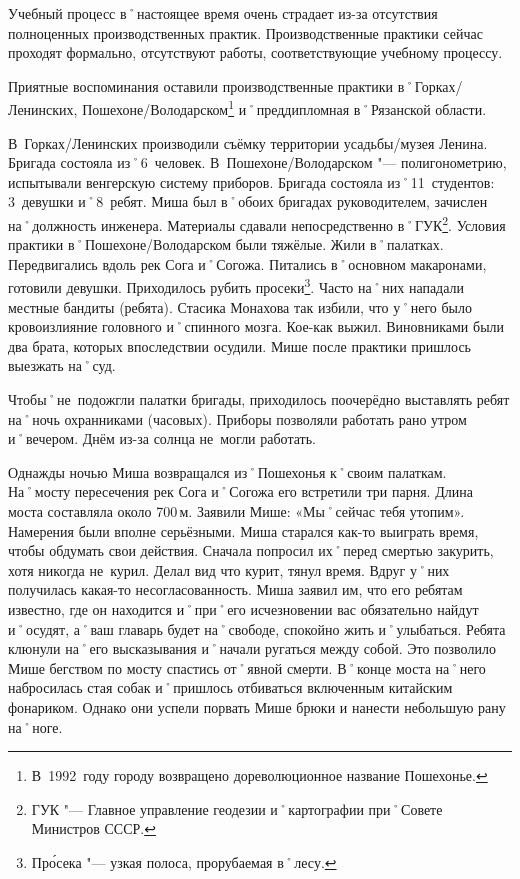 Учебный процесс в˚настоящее время очень страдает из-за отсутствия полноценных производственных практик. Производственные практики сейчас проходят формально, отсутствуют работы, соответствующие учебному процессу. 

Приятные воспоминания оставили производственные практики в˚Горках\-/Ленинских, Пошехоне\-/Володарском\footnote{В~1992~году городу возвращено дореволюционное название Пошехонье.} и˚преддипломная в˚Рязанской области.

В~Горках\-/Ленинских производили съёмку территории усадьбы\-/музея Ленина. Бригада состояла из˚6~человек. В~Пошехоне\-/Володарском "--- полигонометрию, испытывали венгерскую систему приборов. Бригада состояла из˚11~студентов: 3~девушки и˚8~ребят. Миша был в˚обоих бригадах руководителем, зачислен на˚должность инженера. Материалы сдавали непосредственно в˚ГУК\footnote{ГУК "--- Главное управление геодезии и˚картографии при˚Совете Министров СССР.}. Условия практики в˚Пошехоне\-/Володарском были тяжёлые. Жили в˚палатках. Передвигались вдоль рек Сога и˚Согожа. Питались в˚основном макаронами, готовили девушки. Приходилось рубить просеки\footnote{Пр\'{о}сека "--- узкая полоса, прорубаемая в˚лесу.}. Часто на˚них нападали местные бандиты (ребята). Стасика Монахова так избили, что у˚него было кровоизлияние головного и˚спинного мозга. Кое-как выжил. Виновниками были два брата, которых впоследствии осудили. Мише после практики пришлось выезжать на˚суд. 

Чтобы˚не~подожгли палатки бригады, приходилось поочерёдно выставлять ребят на˚ночь охранниками (часовых). Приборы позволяли работать рано утром и˚вечером. Днём из-за солнца не~могли работать. 

Однажды ночью Миша возвращался из˚Пошехонья к˚своим палаткам. На˚мосту пересечения рек Сога и˚Согожа его встретили три парня. Длина моста составляла около 700\,м. Заявили Мише: «Мы˚сейчас тебя утопим». Намерения были вполне серьёзными. Миша старался как-то выиграть время, чтобы обдумать свои действия. Сначала попросил их˚перед смертью закурить, хотя никогда не~курил. Делал вид что курит, тянул время. Вдруг у˚них получилась какая-то несогласованность. Миша заявил им, что его ребятам известно, где он находится и˚при˚его исчезновении вас обязательно найдут и˚осудят, а˚ваш главарь будет на˚свободе, спокойно жить и˚улыбаться. Ребята клюнули на˚его высказывания и˚начали ругаться между собой. Это позволило Мише бегством по мосту спастись от˚явной смерти. В˚конце моста на˚него набросилась стая собак и˚пришлось отбиваться включенным китайским фонариком. Однако они успели порвать Мише брюки и нанести небольшую рану на˚ноге.

